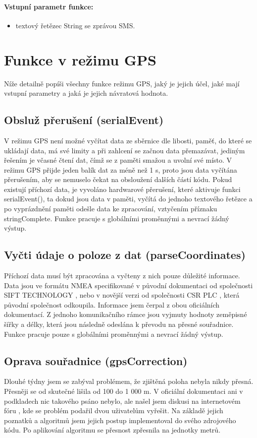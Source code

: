 \documentclass[FM,BP]{tulthesis}  %
\begin{document}
\paragraph{Vstupní parametr funkce:}
\begin{itemize}
\item textový řetězec String se zprávou SMS.
\end{itemize}


\section{Funkce v režimu GPS}
Níže detailně popíši všechny funkce režimu GPS, jaký je jejich účel, jaké mají vstupní parametry a jaká je jejich návratová hodnota.

\subsection{Obsluž přerušení (serialEvent)}
V režimu GPS není možné vyčítat data ze sběrnice dle libosti, paměť, do které se ukládají data, má své limity a při zahlcení se začnou data přemazávat, jediným řešením je včasné čtení dat, čímž se z paměti smažou a uvolní své místo. V režimu GPS přijde jeden balík dat za méně než 1 s, proto jsou data vyčítána přerušením, aby se nemuselo čekat na obsloužení dalších částí kódu. Pokud existují příchozí data, je vyvoláno hardwarové přerušení, které aktivuje funkci serialEvent(), ta dokud jsou data v paměti, vyčítá do jednoho textového řetězce a po vyprázdnění paměti odešle data ke zpracování, vztyčením příznaku stringComplete. Funkce pracuje s globálními proměnnými a nevrací žádný výstup.

\subsection{Vyčti údaje o poloze z dat (parseCoordinates)}
Příchozí data musí být zpracována a vyčteny z nich pouze důležité informace. Data jsou ve formátu NMEA specifikované v původní dokumentaci od společnosti SIFT TECHNOLOGY \cite{SIFT}, nebo v novější verzi od společnosti CSR PLC \cite{CSR}, která původní společnost odkoupila. Informace jsem čerpal z obou oficiálních dokumentací. Z jednoho komunikačního rámce jsou vyjmuty hodnoty zeměpisné šířky a délky, která jsou následně odeslána k převodu na přesné souřadnice. Funkce pracuje pouze s globálními proměnnými a nevrací žádný výstup.

\subsection{Oprava souřadnice (gpsCorrection)}
Dlouhé týdny jsem se zabýval problémem, že zjištěná poloha nebyla nikdy přesná. Přesněji se od skutečné lišila od 100 do 1 000 m. V oficiální dokumentaci ani v podkladech nic takového psáno nebylo, ale našel jsem diskusi na internetovém fóru \cite{correct}, kde se problém podařil dvou uživatelům vyřešit. Na základě jejich poznatků a algoritmů jsem jejich postup implementoval do svého zdrojového kódu. Po aplikování algoritmu se přesnost zpřesnila na jednotky metrů.
\end{document}
